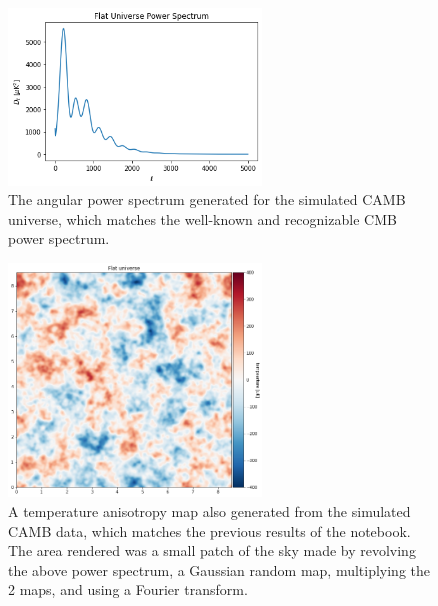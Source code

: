 \documentclass[12pt]{article}
\begin{document}
\begin{figure}[H]
    \centering
    \includegraphics[width=0.6\textwidth]{images/fs.png}
    \caption{The angular power spectrum generated for the simulated CAMB universe, which matches the well-known and recognizable CMB power spectrum.}
    \label{fig:fs}
\end{figure}

\begin{figure}[H]
    \centering
    \includegraphics[width=0.6\textwidth]{images/fa.png}
    \caption{A temperature anisotropy map also generated from the simulated CAMB data, which matches the previous results of the notebook. The area rendered was a small patch of the sky made by revolving the above power spectrum, a Gaussian random map, multiplying the 2 maps, and using a Fourier transform.}
    \label{fig:camb_temp}
\end{figure}
\end{document}
